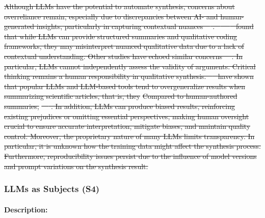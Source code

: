 \documentclass[smallextended]{svjour3}
\newcommand*{\enq}[1]{\enquote{{\itshape#1}}}
\newcommand{\guidelinesubsubsection}[1]{\subsubsection{\bfseries #1:}}
\newcommand{\studytypesubsection}[1]{\subsubsection{#1}}
\newcommand{\studytypeparagraph}[1]{\paragraph{\bfseries #1:}}
\providecommand{\DIFdeltex}[1]{{\protect\color{red}\sout{#1}}}                      %
\providecommand{\DIFaddbegin}{} %
\providecommand{\DIFaddend}{} %
\providecommand{\DIFdelend}{} %
\providecommand{\DIFdel}[1]{\texorpdfstring{\DIFdeltex{#1}}{}} %
\newcommand{\DIFaddincludegraphics}[2][]{{\color{blue}\fbox{\DIFOincludegraphics[#1]{#2}}}} %
\DeclareRobustCommand{\DIFaddbegin}{\DIFOaddbegin \let\includegraphics\DIFaddincludegraphics} %
\DeclareRobustCommand{\DIFaddend}{\DIFOaddend \let\includegraphics\DIFOincludegraphics} %
\DeclareRobustCommand{\DIFdelend}{\DIFOaddend \let\includegraphics\DIFOincludegraphics} %
\begin{document}

\DIFdel{Although LLMs have the potential to automate synthesis, concerns about overreliance remain, especially due to discrepancies between AI- and human-generated insights, particularly in capturing contextual nuances~\mbox{%
\cite{bano2023exploringqualitativeresearchusing}}\hskip0pt%
.
\mbox{%
\citeauthor{bano2023exploringqualitativeresearchusing}}\hskip0pt%
~\mbox{%
\cite{bano2023exploringqualitativeresearchusing} }\hskip0pt%
found that while LLMs can provide structured summaries and qualitative coding frameworks, they may misinterpret nuanced qualitative data due to a lack of contextual understanding.
Other studies have echoed similar concerns~\mbox{%
\cite{DBLP:journals/ase/BanoHZT24, barros2024largelanguagemodelqualitative, leça2024applicationsimplicationslargelanguage}}\hskip0pt%
.
In particular, LLMs cannot independently assess the validity of arguments.
Critical thinking remains a human responsibility in qualitative synthesis.
\mbox{%
\citeauthor{peterschineyee2025generalizationbias} }\hskip0pt%
have shown that popular LLMs and LLM-based tools tend to overgeneralize results when summarizing scientific articles, that is, they }%
\DIFdel{Compared to human-authored summaries, }%
\DIFdel{~\mbox{%
\cite{peterschineyee2025generalizationbias}}\hskip0pt%
.
In addition, LLMs can produce biased results, reinforcing existing prejudices or omitting essential perspectives, making human oversight crucial to ensure accurate interpretation, mitigate biases, and maintain quality control.
Moreover, the proprietary nature of many LLMs limits transparency.
In particular, it is unknown how the training data might affect the synthesis process.
Furthermore, reproducibility issues persist due to the influence of model versions and prompt variations on the synthesis result.
}%

\DIFdelend \DIFaddbegin \studytypesubsection{LLMs as Subjects (S4)}
\DIFaddend \label{sec:llms-as-subjects}

\studytypeparagraph{Description}
\end{document}
